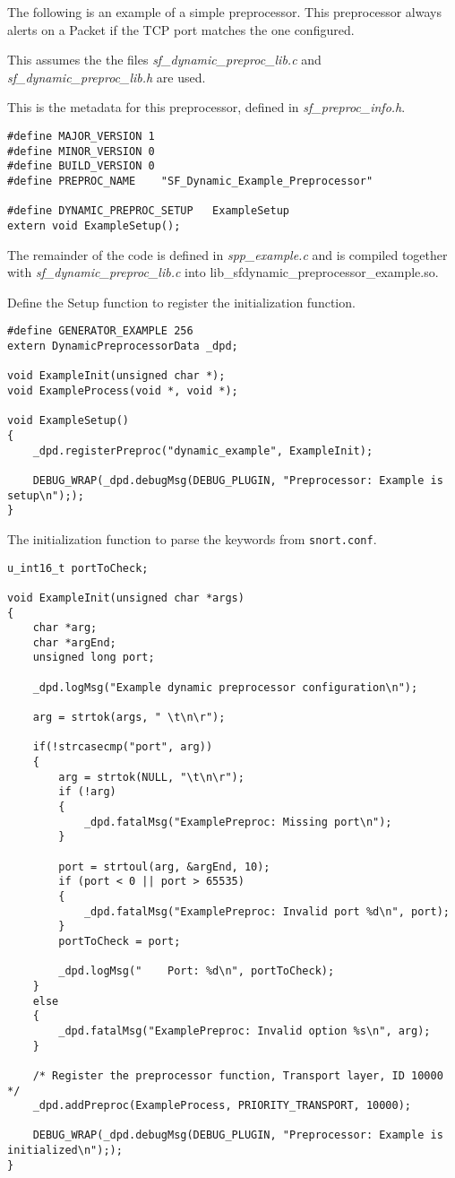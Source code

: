 \documentclass[english]{report}
\begin{document}
The following is an example of a simple preprocessor.  This preprocessor always
alerts on a Packet if the TCP port matches the one configured.

This assumes the the files {\em sf\_dynamic\_preproc\_lib.c} and {\em
sf\_dynamic\_preproc\_lib.h} are used.  

This is the metadata for this preprocessor, defined in {\em
sf\_preproc\_info.h}.

\begin{verbatim}
#define MAJOR_VERSION 1
#define MINOR_VERSION 0
#define BUILD_VERSION 0
#define PREPROC_NAME    "SF_Dynamic_Example_Preprocessor"

#define DYNAMIC_PREPROC_SETUP   ExampleSetup
extern void ExampleSetup();
\end{verbatim}

The remainder of the code is defined in {\em spp\_example.c} and is compiled
together with {\em sf\_dynamic\_preproc\_lib.c} into
lib\_sfdynamic\_preprocessor\_example.so.

Define the Setup function to register the initialization function.

\begin{verbatim}
#define GENERATOR_EXAMPLE 256
extern DynamicPreprocessorData _dpd;

void ExampleInit(unsigned char *);
void ExampleProcess(void *, void *);

void ExampleSetup()
{
    _dpd.registerPreproc("dynamic_example", ExampleInit);

    DEBUG_WRAP(_dpd.debugMsg(DEBUG_PLUGIN, "Preprocessor: Example is setup\n"););
}
\end{verbatim}

The initialization function to parse the keywords from \texttt{snort.conf}.

\begin{verbatim}
u_int16_t portToCheck;

void ExampleInit(unsigned char *args)
{
    char *arg;
    char *argEnd;
    unsigned long port;

    _dpd.logMsg("Example dynamic preprocessor configuration\n");

    arg = strtok(args, " \t\n\r");

    if(!strcasecmp("port", arg))
    {
        arg = strtok(NULL, "\t\n\r");
        if (!arg)
        {
            _dpd.fatalMsg("ExamplePreproc: Missing port\n");
        }
        
        port = strtoul(arg, &argEnd, 10);
        if (port < 0 || port > 65535)
        {
            _dpd.fatalMsg("ExamplePreproc: Invalid port %d\n", port);
        }
        portToCheck = port;
    
        _dpd.logMsg("    Port: %d\n", portToCheck);
    }
    else
    {
        _dpd.fatalMsg("ExamplePreproc: Invalid option %s\n", arg);
    }

    /* Register the preprocessor function, Transport layer, ID 10000 */
    _dpd.addPreproc(ExampleProcess, PRIORITY_TRANSPORT, 10000);

    DEBUG_WRAP(_dpd.debugMsg(DEBUG_PLUGIN, "Preprocessor: Example is initialized\n"););
}
\end{verbatim}
\end{document}
